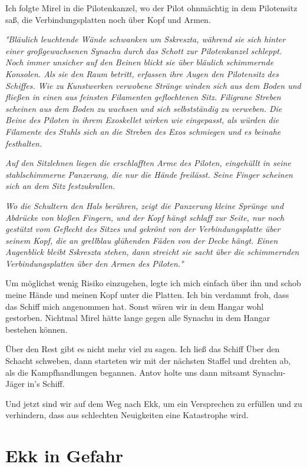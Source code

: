 \documentclass[11pt]{article}
\begin{document}
Ich folgte Mirel in die Pilotenkanzel, wo der Pilot ohnmächtig in dem
Pilotensitz saß, die Verbindungsplatten noch über Kopf und Armen.

\emph{°Bläulich leuchtende Wände schwanken um Sskreszta, während sie
sich hinter einer großgewachsenen Synachu durch das Schott zur
Pilotenkanzel schleppt. Noch immer unsicher auf den Beinen blickt sie
über bläulich schimmernde Konsolen. Als sie den Raum betritt, erfassen
ihre Augen den Pilotensitz des Schiffes. Wie zu Kunstwerken verwobene
Stränge winden sich aus dem Boden und fließen in einen aus feinsten
Filamenten geflochtenen Sitz. Filigrane Streben scheinen aus dem Boden
zu wachsen und sich selbstständig zu verweben. Die Beine des Piloten in
ihrem Exoskellet wirken wie eingepasst, als würden die Filamente des
Stuhls sich an die Streben des Exos schmiegen und es beinahe
festhalten.}

\emph{Auf den Sitzlehnen liegen die erschlafften Arme des Piloten,
eingehüllt in seine stahlschimmerne Panzerung, die nur die Hände
freilässt. Seine Finger scheinen sich an dem Sitz festzukrallen.}

\emph{Wo die Schultern den Hals berühren, zeigt die Panzerung kleine
Sprünge und Abdrücke von bloßen Fingern, und der Kopf hängt schlaff zur
Seite, nur noch gestützt vom Geflecht des Sitzes und gekrönt von der
Verbindungsplatte über seinem Kopf, die an grellblau glühenden Fäden von
der Decke hängt. Einen Augenblick bleibt Sskreszta stehen, dann streicht
sie sacht über die schimmernden Verbindungsplatten über den Armen des
Piloten.°}

Um möglichst wenig Risiko einzugehen, legte ich mich einfach über ihn
und schob meine Hände und meinen Kopf unter die Platten. Ich bin
verdammt froh, dass das Schiff mich angenommen hat. Sonst wären wir in
dem Hangar wohl gestorben. Nichtmal Mirel hätte lange gegen alle Synachu
in dem Hangar bestehen können.

Über den Rest gibt es nicht mehr viel zu sagen. Ich ließ das Schiff Über
den Schacht schweben, dann starteten wir mit der nächsten Staffel und
drehten ab, als die Kampfhandlungen begannen. Antov holte uns dann
mitsamt Synachu-Jäger in's Schiff.

Und jetzt sind wir auf dem Weg nach Ekk, um ein Versprechen zu erfüllen
und zu verhindern, dass aus schlechten Neuigkeiten eine Katastrophe
wird.

\section{Ekk in Gefahr}
\end{document}
